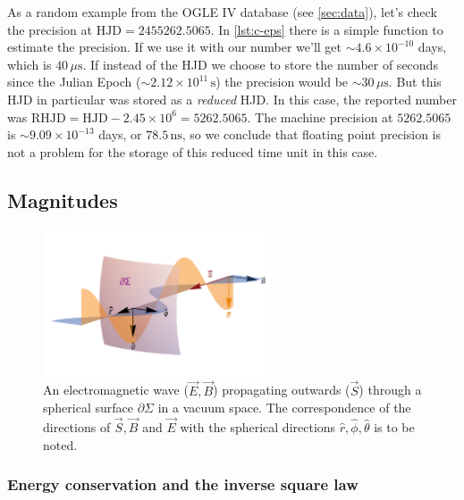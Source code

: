 	
	As a random example from the OGLE IV database (see \autoref{sec:data}), let's check the precision at $\text{HJD}=2455262.5065$. 
	In \autoref{lst:c-eps} there is a simple function to estimate the precision. 
	If we use it with our number we'll get $\sim 4.6\times 10^{-10}$ days, which is $40 \,\mu \text{s}$. 
	If instead of the HJD we choose to store the number of seconds since the Julian Epoch ($\sim 2.12\times 10^{11} \,\text{s}$) 
	the precision would be $\sim 30 \,\mu \text{s}$.
	But this HJD in particular was stored as a \textit{reduced} HJD. In this case, the reported number was $\text{RHJD}=\text{HJD}-2.45\times 10^6 = 5262.5065$.
	The machine precision at $5262.5065$ is $\sim 9.09\times 10^{-13} $ days, or $78.5 \,\text{ns}$, 
	so we conclude that floating point precision is not a problem for the storage of this reduced time unit in this case.
	
\subsection{Magnitudes}

	\begin{figure}[H]
		\centering
		\includegraphics[width=0.6\textwidth]{img/Spherical_EM.pdf}
		\caption[Electromagnetic wave propagation through a sperical surface]{
			An electromagnetic wave ($\vec E,\vec B$) propagating outwards ($\vec S$) through a spherical surface $\partial \Sigma$ in a vacuum space.
			The correspondence of the directions of $\vec S,\vec B$ and $\vec E$ with the spherical directions $\hat r,\hat \phi, \hat \theta$ is to be noted.
		}
		\label{fig:spherical-em}
	\end{figure}
	
	\subsubsection{Energy conservation and the inverse square law}

